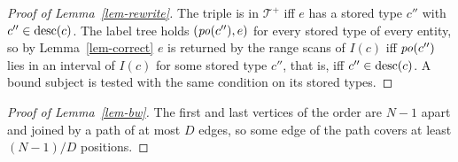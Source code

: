 \begin{proof}[Proof of Lemma~\ref{lem-rewrite}]
The triple is in $\mathcal{T}^{+}$ iff $e$ has a stored type $c''$ with
$c''\in\mathrm{desc}(c)$.
The label tree holds $(\mathit{po}(c''),e)$ for every stored type of every entity, so by
Lemma~\ref{lem-correct} $e$ is returned by the range scans of $I(c)$ iff $\mathit{po}(c'')$
lies in an interval of $I(c)$ for some stored type $c''$, that is, iff
$c''\in\mathrm{desc}(c)$.
A bound subject is tested with the same condition on its stored types.
\end{proof}

\begin{proof}[Proof of Lemma~\ref{lem-bw}]
The first and last vertices of the order are $N-1$ apart and joined by a path of at
most $D$ edges, so some edge of the path covers at least $(N-1)/D$ positions.
\end{proof}
\fi
